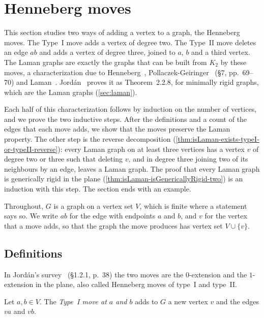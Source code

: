 \section{Henneberg moves}
\label{sec:henneberg}

This section studies two ways of adding a vertex to a graph, the
Henneberg moves. The Type~I move adds a vertex of degree two. The
Type~II move deletes an edge $ab$ and adds a vertex of degree three,
joined to $a$, $b$ and a third vertex. The Laman graphs are exactly
the graphs that can be built from $K_2$ by these moves, a
characterization due to Henneberg~\cite{henneberg1911},
Pollaczek-Geiringer~\cite{pollaczekGeiringer1927} (\S7, pp.~69--70) and
Laman~\cite{laman1970}. Jord\'an~\cite{jordan2016} proves it as
Theorem~2.2.8, for minimally rigid graphs, which are the Laman graphs
(\cref{sec:laman}).

Each half of this characterization follows by induction on the number
of vertices, and we prove the two inductive steps. After the
definitions and a count of the edges that each move adds, we show that
the moves preserve the Laman property. The other step is the reverse
decomposition (\cref{thm:isLaman-exists-typeI-or-typeII-reverse}):
every Laman graph on at least three vertices has a vertex $v$ of
degree two or three such that deleting $v$, and in degree three
joining two of its neighbours by an edge, leaves a Laman graph. The
proof that every Laman graph is generically rigid in the plane
(\cref{thm:isLaman-isGenericallyRigid-two}) is an induction with this
step. The section ends with an example.

Throughout, $G$ is a graph on a vertex set $V$, which is finite where
a statement says so. We write $ab$ for the edge with endpoints $a$ and
$b$, and $v$ for the vertex that a move adds, so that the graph the
move produces has vertex set $V \cup \{v\}$.

\subsection{Definitions}

In Jord\'an's survey~\cite{jordan2016} (\S 1.2.1, p.~38) the two moves
are the $0$-extension and the $1$-extension in the plane, also called
Henneberg moves of type~I and type~II.

\begin{definition}
  \label{def:typeI}
  \leanok
  Let $a, b \in V$. The \emph{Type~I move at $a$ and $b$} adds to $G$
  a new vertex $v$ and the edges $va$ and $vb$.
\end{definition}

